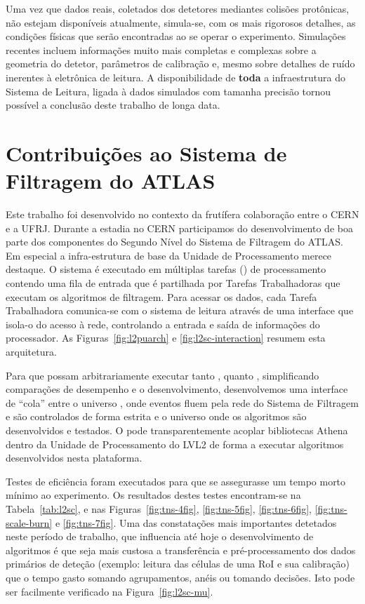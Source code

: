 Uma vez que dados reais, coletados dos detetores mediantes colisões
protônicas, não estejam disponíveis atualmente, simula-se, com os mais
rigorosos detalhes, as condições físicas que serão encontradas ao se operar o
experimento. Simulações recentes incluem informações muito mais completas e
complexas sobre a geometria do detetor, parâmetros de calibração e, mesmo
sobre detalhes de ruído inerentes à eletrônica de leitura. A disponibilidade
de \textbf{toda} a infraestrutura do Sistema de Leitura, ligada à dados
simulados com tamanha precisão tornou possível a conclusão deste trabalho de
longa data.

\section{Contribuições ao Sistema de Filtragem do ATLAS}

Este trabalho foi desenvolvido no contexto da frutífera colaboração entre o
CERN e a UFRJ. Durante a estadia no CERN participamos do desenvolvimento de
boa parte dos componentes do Segundo Nível do Sistema de Filtragem do
ATLAS. Em especial a infra-estrutura de base da Unidade de Processamento
merece destaque. O sistema é executado em múltiplas tarefas () de
processamento contendo uma fila de entrada que é partilhada por Tarefas
Trabalhadoras que executam os algoritmos de filtragem. Para acessar os dados,
cada Tarefa Trabalhadora comunica-se com o sistema de leitura através de uma
interface que isola-o do acesso à rede, controlando a entrada e saída de
informações do processador. As Figuras~\ref{fig:l2puarch} e
\ref{fig:l2sc-interaction} resumem esta arquitetura.

Para que possam arbitrariamente executar tanto , quanto
, simplificando comparações de desempenho e o desenvolvimento,
desenvolvemos uma interface de ``cola'' entre o universo , onde
eventos fluem pela rede do Sistema de Filtragem e são controlados de forma
estrita e o universo  onde os algoritmos são desenvolvidos e
testados. O  pode transparentemente acoplar
bibliotecas Athena dentro da Unidade de Processamento do LVL2 de forma a
executar algoritmos desenvolvidos nesta plataforma. 

Testes de eficiência foram executados para que se assegurasse um tempo morto
mínimo ao experimento. Os resultados destes testes encontram-se na
Tabela~\ref{tab:l2sc}, e nas Figuras~\ref{fig:tns-4fig}, \ref{fig:tns-5fig},
\ref{fig:tns-6fig}, \ref{fig:tns-scale-burn} e \ref{fig:tns-7fig}. Uma das
constatações mais importantes detetados neste período de trabalho, que
influencia até hoje o desenvolvimento de algoritmos é que seja mais custosa a
transferência e pré-processamento dos dados primários de deteção (exemplo:
leitura das células de uma RoI e sua calibração) que o tempo gasto somando
agrupamentos, anéis ou tomando decisões. Isto pode ser facilmente verificado na
Figura~\ref{fig:l2sc-mu}.


